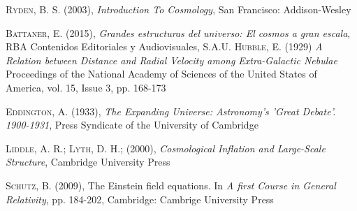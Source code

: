 \documentclass[a4paper,openright,10pt, oneside, final]{book}
\begin{document}
\cleardoublepage
{}
\begin{thebibliography}{a}

 \textsc{Ryden, B. S. (2003)},
\textit{Introduction To Cosmology},
San Francisco: Addison-Wesley

 \textsc{Battaner, E. (2015)},
\textit{Grandes estructuras del universo: El cosmos a gran escala},
RBA Contenidos Editoriales y Audiovisuales, S.A.U.
 \textsc{Hubble, E. (1929)}
\textit{A Relation between Distance and Radial Velocity among Extra-Galactic Nebulae}
Proceedings of the National Academy of Sciences of the United States of America, 
vol. 15, Issue 3, pp. 168-173

 \textsc{Eddington, A. (1933)},
\textit{The Expanding Universe: Astronomy's 'Great Debate'. 1900-1931},
Press Syndicate of the University of Cambridge

 \textsc{Liddle, A. R.; Lyth, D. H.; (2000)},
\textit{Cosmological Inflation and Large-Scale Structure},
Cambridge University Press

 \textsc{Schutz, B. (2009)},
The Einstein field equations. In
\textit{A first Course in General Relativity},
pp. 184-202, Cambridge: Cambrige University Press


\end{thebibliography}
\end{document}
